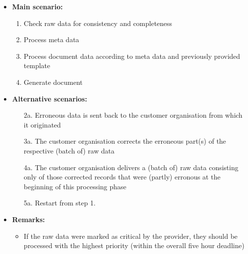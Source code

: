 \documentclass[a4paper,10pt]{article}
\begin{document}
\begin{itemize}
    \item \textbf{Main scenario:} 
    \begin{enumerate}
       \item Check raw data for consistency and completeness
       \item Process meta data
       \item Process document data according to meta data and previously provided template
       \item Generate document
    \end{enumerate}
    \item \textbf{Alternative scenarios:} 
    \begin{enumerate}
        \item [2a.] Erroneous data is sent back to the customer organisation from which it originated
        \item [3a.] The customer organisation corrects the erroneous part(s) of the respective (batch of) raw data
        \item [4a.] The customer organisation delivers a (batch of) raw data consisting only of those corrected records that were (partly) erronous at the beginning of this processing phase
        \item [5a.] Restart from step 1.
    \end{enumerate}
    \item \textbf{Remarks:}
        \begin{itemize}
        	\item If the raw data were marked as critical by the provider, they should be processed with the highest priority (within the overall five hour deadline)
        \end{itemize}
\end{itemize}
\end{document}
